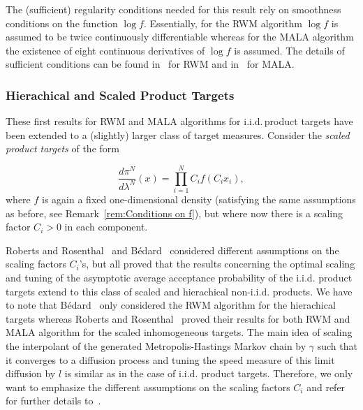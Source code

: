 \begin{rem}
\label{rem:Conditions on f}
 The (sufficient) regularity conditions needed for this result rely on smoothness conditions on the function $\log f$. Essentially, for the RWM algorithm $\log f$ is assumed to be twice continuously differentiable whereas for the MALA algorithm the existence of eight continuous derivatives of $\log f$ is assumed. The details of sufficient conditions can be found in~\autocite{Roberts1997} for RWM and in~\autocite{Roberts1998} for MALA.
\end{rem}





\subsubsection{Hierachical and Scaled Product Targets} 

These first results for RWM and MALA algorithms for i.i.d.\,product targets have been extended to a (slightly) larger class of target measures. Consider the  \textit{scaled product targets} of the form

\begin{equation}
 \label{CC:Scaled product targets}
 \frac{d \pi^{N}}{d \lambda^{N}}(x) = \prod_{i=1}^{N} C_i f(C_i x_i),
\end{equation}
where $f$ is again a fixed one-dimensional density (satisfying the same assumptions as before, see Remark~\ref{rem:Conditions on f}), but where now there is a scaling factor $C_i > 0$ in each component.

Roberts and Rosenthal~\autocite{Roberts2001} and B\'{e}dard~\autocite{Bedard2007} considered different assumptions on the scaling factors $ C_i $'s, but all proved that the results concerning the optimal scaling and tuning of the asymptotic average acceptance probability of the i.i.d. product targets extend to this class of scaled and hierachical non-i.i.d. products. We have to note that B\'{e}dard~\autocite{Bedard2007} only considered the RWM algorithm for the hierachical targets whereas Roberts and Rosenthal~\autocite{Roberts2001} proved their results for both RWM and MALA algorithm for the scaled inhomogeneous targets.
The main idea of scaling the interpolant of the generated Metropolis-Hastings Markov chain by $\gamma$ such that it converges to a diffusion process and tuning the speed measure of this limit diffusion by $l$ is similar as in the case of i.i.d. product targets. Therefore, we only want to emphasize the different assumptions on the scaling factors $C_i$ and refer for further details to~\autocite{Bedard2007, Roberts2001}.


